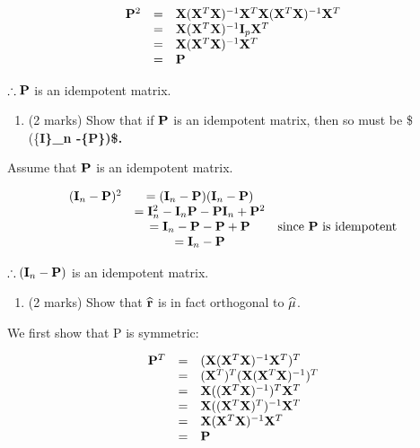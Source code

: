 \documentclass[9pt,letter]{article}
\providecommand{\tightlist}{%
  \setlength{\itemsep}{0pt}\setlength{\parskip}{0pt}}
\begin{document}
\[
\begin{array}{rcl}
{\bf P}^2 &=& {\bf X} ({\bf X}^T {\bf X})^{-1}{\bf X}^T{\bf X} ({\bf X}^T {\bf X})^{-1}{\bf X}^T\\
&=& {\bf X}({\bf X}^T {\bf X})^{-1}{\bf I}_p{\bf X}^T\\
&=& {\bf X}({\bf X}^T {\bf X})^{-1}{\bf X}^T\\
&=& {\bf P}
\end{array}
\]

\(\therefore {\bf P}\) is an idempotent matrix.

\begin{enumerate}
\def\labelenumi{(\alph{enumi})}
\setcounter{enumi}{2}
\tightlist
\item
  (2 marks) Show that if \({\bf P}\) is an idempotent matrix, then so
  must be \$ (\{\bf I\}\_n -\{\bf P\})\$.
\end{enumerate}

Assume that \({\bf P}\) is an idempotent matrix.

\[
\begin{array}{rcl}
({\bf I}_n -{\bf P})^2 &= ({\bf I}_n -{\bf P})({\bf I}_n -{\bf P}) \\
&= {\bf I}_n^2 -{\bf I}_n{\bf P}-{\bf P}{\bf I}_n+{\bf P}^2 \\
&= {\bf I}_n-{\bf P}-{\bf P}+{\bf P} & \text{since } {\bf P} \text{ is idempotent} \\
&= {\bf I}_n-{\bf P}
\end{array}
\]

\(\therefore ({\bf I}_n -{\bf P})\) is an idempotent matrix.

\begin{enumerate}
\def\labelenumi{(\alph{enumi})}
\setcounter{enumi}{3}
\tightlist
\item
  (2 marks) Show that \(\widehat{\bf r}\) is in fact orthogonal to
  \(\widehat{\bf \mu}\).
\end{enumerate}

We first show that P is symmetric:

\[
\begin{array}{rcl}
{\bf P}^T &=& ({\bf X} ({\bf X}^T {\bf X})^{-1}{\bf X}^T)^T\\
&=& ({\bf X}^T)^T({\bf X} ({\bf X}^T {\bf X})^{-1})^T\\
&=& {\bf X}(({\bf X}^T {\bf X})^{-1})^T{\bf X}^T\\
&=& {\bf X}(({\bf X}^T {\bf X})^T)^{-1}{\bf X}^T\\
&=& {\bf X}({\bf X}^T {\bf X})^{-1}{\bf X}^T\\
&=& {\bf P}
\end{array}
\]
\end{document}
